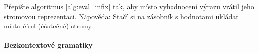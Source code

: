 
\begin{cviceni} Přepište algoritmus \ref{alg:eval_infix} tak, aby místo
vyhodnocení výrazu vrátil jeho stromovou reprezentaci. Nápověda: Stačí
si na zásobník s hodnotami ukládat místo čísel (částečné) stromy.
\end{cviceni}




\paragraph{Bezkontextové gramatiky}

\ifx\ucebnice\undefined

\fi
